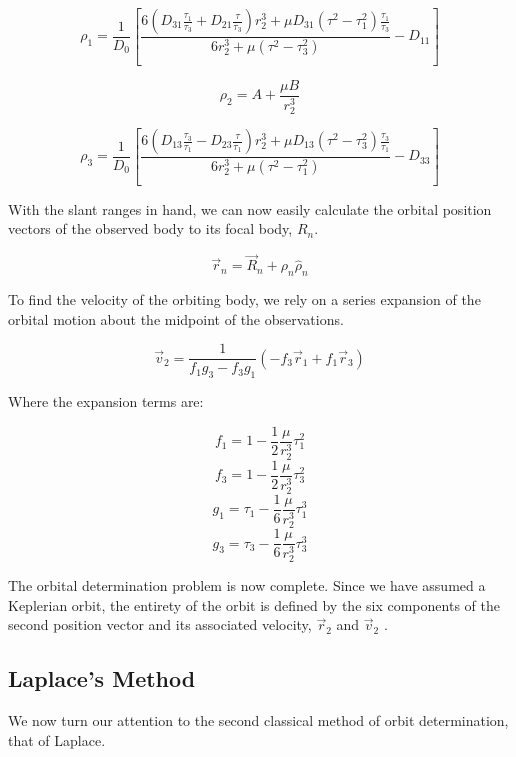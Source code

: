 \documentclass[11pt,twoside,letterpaper]{article}
\begin{document}
  \begin{equation}
    \rho_1 = \frac{1}{D_0}\left[
      \frac{6\left(D_{31}\frac{\tau_1}{\tau_3} + D_{21}\frac{\tau}{\tau_3}\right)r_2^3
        + \mu D_{31}\left(\tau^2 - \tau_1^2\right)\frac{\tau_1}{\tau_3}}{6r_2^3
        + \mu\left(\tau^2 - \tau_3^2\right)} - D_{11}\right]
  \end{equation}

  \begin{equation}
    \rho_2 = A + \frac{\mu B}{r_2^3}
  \end{equation}

  \begin{equation}
    \rho_3 = \frac{1}{D_0}\left[
      \frac{6\left(D_{13}\frac{\tau_3}{\tau_1} - D_{23}\frac{\tau}{\tau_1}\right)r_2^3
        + \mu D_{13}\left(\tau^2 - \tau_3^2\right)\frac{\tau_3}{\tau_1}}{6r_2^3
        + \mu\left(\tau^2 - \tau_1^2\right)} - D_{33}\right]    
  \end{equation}

  With the slant ranges in hand, we can now easily calculate the
  orbital position vectors of the observed body to its focal body,
  $R_n$.

  \begin{equation}
    \vec{r}_n = \vec{R}_n + \rho_n{\hat{\rho}}_n
  \end{equation}

  To find the velocity of the orbiting body, we rely on a series
  expansion of the orbital motion about the midpoint of the
  observations.

  \begin{equation}
    \vec{v}_2 = \frac{1}{f_1g_3 - f_3g_1}\left(-f_3\vec{r}_1 + f_1\vec{r}_3\right)
  \end{equation}

  Where the expansion terms are:

  \begin{equation}
    f_1 = 1 - \frac{1}{2}\frac{\mu}{r_2^3}\tau_1^2
  \end{equation}
  \begin{equation}
    f_3 = 1 - \frac{1}{2}\frac{\mu}{r_2^3}\tau_3^2
  \end{equation}
  \begin{equation}
    g_1 = \tau_1 - \frac{1}{6}\frac{\mu}{r_2^3}\tau_1^3
  \end{equation}
  \begin{equation}    
    g_3 = \tau_3 - \frac{1}{6}\frac{\mu}{r_2^3}\tau_3^3
  \end{equation}

  The orbital determination problem is now complete. Since we have
  assumed a Keplerian orbit, the entirety of the orbit is defined by
  the six components of the second position vector and its associated
  velocity, $\vec{r}_2$ and $\vec{v}_2$ \cite{kluever_2018}.

  \subsection{Laplace's Method}
  We now turn our attention to the second classical method of orbit
  determination, that of Laplace. 

  {}
  
\end{document}
